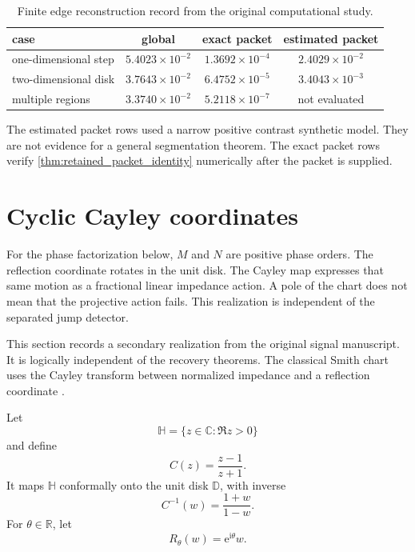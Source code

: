\documentclass[11pt,letterpaper]{article}
\theoremstyle{plain}
\theoremstyle{plain}
\theoremstyle{plain}
\theoremstyle{definition}
\theoremstyle{definition}
\theoremstyle{definition}
\theoremstyle{definition}
\theoremstyle{remark}
\theoremstyle{remark}
\theoremstyle{remark}
\theoremstyle{remark}
\newcommand{\ii}{\mathrm i}
\newcommand{\CC}{\mathbb C}
\newcommand{\RR}{\mathbb R}
\newcommand{\e}{\mathrm e}
\begin{document}
\begin{table}
\centering
\caption{Finite edge reconstruction record from the original computational study.}
\label{tab:edge_record}
\small
\begin{tabular}{lccc}
\toprule
case & global & exact packet & estimated packet\\
\midrule
one-dimensional step & \(5.4023\times10^{-2}\) & \(1.3692\times10^{-4}\) & \(2.4029\times10^{-2}\)\\
two-dimensional disk & \(3.7643\times10^{-2}\) & \(6.4752\times10^{-5}\) & \(3.4043\times10^{-3}\)\\
multiple regions & \(3.3740\times10^{-2}\) & \(5.2118\times10^{-7}\) & not evaluated\\
\bottomrule
\end{tabular}
\end{table}

The estimated packet rows used a narrow positive contrast synthetic model. They are not evidence for a general segmentation theorem. The exact packet rows verify \cref{thm:retained_packet_identity} numerically after the packet is supplied.

\section{Cyclic Cayley coordinates}\label{extension:section:14}\label{sec:cayley}

\begin{interpretation}[title={Keep the rotation and its chart separate}]
For the phase factorization below, $M$ and $N$ are positive phase orders. The reflection coordinate rotates in the unit disk. The Cayley map expresses that same motion as a fractional linear impedance action. A pole of the chart does not mean that the projective action fails. This realization is independent of the separated jump detector.
\end{interpretation}

This section records a secondary realization from the original signal manuscript. It is logically independent of the recovery theorems. The classical Smith chart uses the Cayley transform between normalized impedance and a reflection coordinate \cite{Smith1969}.

Let
\[
\mathbb H
=
\{z\in\CC:\Re z>0\}
\]
and define
\[
C(z)=\frac{z-1}{z+1}.
\]
It maps \(\mathbb H\) conformally onto the unit disk \(\mathbb D\), with inverse
\[
C^{-1}(w)=\frac{1+w}{1-w}.
\]
For \(\theta\in\RR\), let
\[
R_\theta(w)=\e^{\ii\theta}w.
\]
\end{document}

